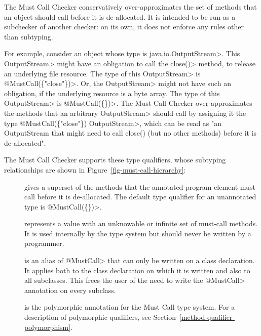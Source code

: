 \htmlhr
{}

The Must Call Checker conservatively over-approximates
the set of methods that an object should call before it is de-allocated.
It is intended to be run as a subchecker of another checker: on its own, it does not
enforce any rules other than subtyping.

For example, consider an object whose type is \<java.io.OutputStream>.
This \<OutputStream> might have an obligation to call the \<close()> method, to release an
underlying file resource. The type of this \<OutputStream> is \<@MustCall(\{"close"\})>.
 Or, the \<OutputStream> might not have such an obligation, if the
underlying resource is a byte array. The type of this \<OutputStream> is \<@MustCall(\{\})>.
The Must Call Checker over-approximates the methods that an arbitrary
\<OutputStream> should call by assigning it the type \<@MustCall(\{"close"\}) OutputStream>, which can be read
as "an OutputStream that might need to call close() (but no other methods) before it is de-allocated".


The Must Call Checker supports these type qualifiers, whose subtyping relationships
are shown in Figure~\ref{fig-must-call-hierarchy}:

\begin{description}

\item[]
  gives a superset of the methods that the annotated program element
  must call before it is de-allocated.
  The default type qualifier for an unannotated type is \<@MustCall(\{\})>.

\item[]
  represents a value with an unknowable or infinite set of must-call methods.
  It is used internally by the type system but should never be written by a
  programmer.

\item[]
  is an alias of \<@MustCall> that can only be written on a class declaration.
  It applies both to the class declaration on which it is written and also to all subclasses.
  This frees the user of the need to write the \<@MustCall> annotation on every subclass.

\item[]
  is the polymorphic annotation for the Must Call type system.
  For a description of polymorphic qualifiers, see
  Section~\ref{method-qualifier-polymorphism}.

\end{description}

